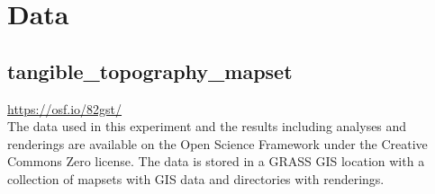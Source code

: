 \documentclass[prodmode,acmtochi]{acmsmall} %
\begin{document}


\section{Data}\label{appendix:data}
\subsection{tangible\_topography\_mapset}
\url{https://osf.io/82gst/}\\

\noindent
The data used in this experiment 
and the results 
including analyses and renderings %
are available on the Open Science Framework 
under the Creative Commons Zero license. 
The data is stored in a GRASS GIS location
with a collection of mapsets with GIS data
and directories with renderings.

\vfill







\end{document}
